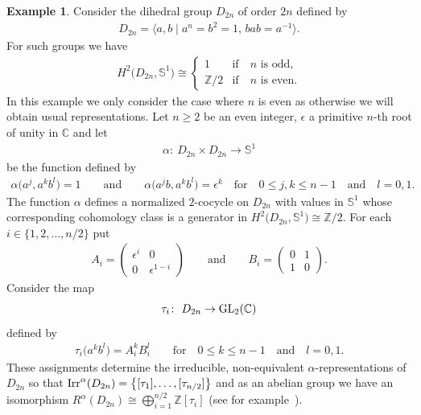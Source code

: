 \documentclass[pdftex]{sigma}
\def\Z{\mathbb{Z}}
\def\S{\mathbb{S}}
\def\C{\mathbb{C}}
\DeclareMathOperator{\Irr}{\textup{Irr}}
\theoremstyle{definition}
\newtheorem{Ex}[Th]{Example}
\numberwithin{equation}{section}
\begin{document}
\begin{Ex}\label{ej,D2n}
Consider the dihedral group $D_{2n}$ of order $2n$ defined by
\begin{gather*}
D_{2n}=\big\langle a,b\mid a^{n}=b^{2}=1,\, bab=a^{-1}\big\rangle.
\end{gather*}
For such groups we have
\begin{gather*}
H^{2}\big(D_{2n},\S^{1}\big)\cong
\begin{cases}
1 &\text{if}\quad n \text{ is odd},
\\
\Z/2 & \text{if}\quad n \text{ is even}.
\end{cases}
\end{gather*}
In this example we only consider the case where $n$ is even as otherwise we will obtain
usual representations. Let $n\geq 2$ be an even integer, $\epsilon$ a primitive $n$-th root of
unity in $\C$ and let
\begin{gather*}
\alpha\colon\ D_{2n}\times D_{2n}\rightarrow \S^{1}
\end{gather*}
be the function defined by
\begin{gather*}
\alpha\big(a^{j},a^{k}b^{l}\big)=1 \qquad \text{and} \qquad
\alpha\big(a^{j}b,a^{k}b^{l}\big)=\epsilon^{k}\quad \text{for}\quad
0\leq j,k\leq n-1 \quad \text{and}\quad l=0,1.
\end{gather*}
The function $\alpha$ defines a normalized $2$-cocycle on $D_{2n}$ with values in $\S^{1}$ whose
corresponding cohomology class is a generator in $H^{2}\big(D_{2n},\S^{1}\big)\cong \Z/2$.
For each $i\in\{1,2,\dots,n/2\}$ put
\begin{gather*}
A_{i}=\begin{pmatrix}
\epsilon^{i} & 0 \\
0 & \epsilon^{1-i}
\end{pmatrix}
\qquad \text{and} \qquad
B_{i}=\begin{pmatrix}
0 & 1\\
1 &0
\end{pmatrix}\!.
\end{gather*}
Consider the map
\begin{gather*}
\tau_{i}\colon\ D_{2n}\rightarrow {\rm GL}_{2}(\C)
\end{gather*}
defined by
\begin{gather*}
\tau_{i}\big(a^{k}b^{l}\big)=A_{i}^{k}B_{i}^{l} \qquad \text{for} \quad 0\leq k\leq n-1 \quad
\text{and}\quad l=0,1.
\end{gather*}
These assignments determine the irreducible, non-equivalent $\alpha$-representations of $D_{2n}$
so that $\Irr^{\alpha}(D_{2n})=\big\{[\tau_{1}],\dots, [\tau_{n/2}]\big\}$ and as an abelian group we
have an isomorphism $R^{\alpha}(D_{2n})\cong \bigoplus_{i=1}^{n/2}\Z[\tau_{i}]$
(see for example~\cite[Chapter 5, Theorem 7.1]{Karpilovsky3}).
\end{Ex}
\end{document}
